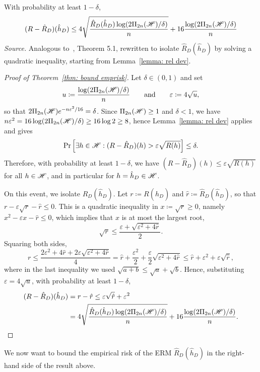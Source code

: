 \documentclass[reqno]{amsart}
\begin{document}
\begin{theorem}\label{thm: bound emprisk}
    With probability at least $1-\delta$,
    \[
    (R - \hat R_D)(\hat h_D) \le 4\sqrt{\frac{\hat R_D(\hat h_D)\log(2\Pi_{2n}(\mathscr{H})/\delta)}{n}} + 16\frac{\log(2\Pi_{2n}(\mathscr{H})/\delta)}{n}
    \]
\textnormal{\emph{Source.} Analogous to~\cite{boucheron2005theory}, Theorem 5.1, rewritten to isolate $\hat R_D(\hat h_D)$ by solving a quadratic inequality, starting from Lemma~\ref{lemma: rel dev}.}

\begin{proof}[Proof of Theorem~\ref{thm: bound emprisk}]
Let $\delta\in(0,1)$ and set
\[
u\coloneq\frac{\log(2\Pi_{2n}(\mathscr{H})/\delta)}{n} \qquad\text{and}\qquad \varepsilon\coloneq 4\sqrt{u},
\]
so that $2\Pi_{2n}(\mathscr{H})e^{-n\varepsilon^2/16} = \delta$. Since $\Pi_{2n}(\mathscr{H})\ge1$ and $\delta<1$, we have $n\varepsilon^2 = 16\log(2\Pi_{2n}(\mathscr{H})/\delta) \ge 16\log 2 \ge 8$, hence Lemma~\ref{lemma: rel dev} applies and gives
\[
\Pr\left[\exists h\in\mathscr{H} : (R-\hat R_D)(h) > \varepsilon\sqrt{R(h)}\right] \le \delta.
\]
Therefore, with probability at least $1-\delta$, we have $(R-\hat R_D)(h)\le\varepsilon\sqrt{R(h)}$ for all $h\in\mathscr{H}$, and in particular for $h=\hat h_D\in\mathscr{H}$.

On this event, we isolate $\hat R_D(\hat h_D)$. Let $r\coloneq R(\hat h_D)$ and $\hat r\coloneq\hat R_D(\hat h_D)$, so that $r-\varepsilon\sqrt r-\hat r\le0$. This is a quadratic inequality in $x\coloneq\sqrt r\ge0$, namely $x^2-\varepsilon x-\hat r\le0$, which implies that $x$ is at most the largest root,
\[
\sqrt r \le \frac{\varepsilon+\sqrt{\varepsilon^2+4\hat r}}{2}.
\]
Squaring both sides,
\[
r \le \frac{2\varepsilon^2 + 4\hat r + 2\varepsilon\sqrt{\varepsilon^2+4\hat r}}{4} = \hat r + \frac{\varepsilon^2}{2} + \frac{\varepsilon}{2}\sqrt{\varepsilon^2+4\hat r} \le \hat r + \varepsilon^2 + \varepsilon\sqrt{\hat r},
\]
where in the last inequality we used $\sqrt{a+b}\le\sqrt a+\sqrt b$. Hence, substituting $\varepsilon = 4\sqrt u$, with probability at least $1-\delta$,
\begin{align*}
(R-\hat R_D)(\hat h_D) &= r-\hat r \le \varepsilon\sqrt{\hat r} + \varepsilon^2 \\ &= 4\sqrt{\frac{\hat R_D(\hat h_D)\log(2\Pi_{2n}(\mathscr{H})/\delta)}{n}} + 16\frac{\log(2\Pi_{2n}(\mathscr{H})/\delta)}{n}.
\end{align*}
\end{proof}
\end{theorem}

We now want to bound the empirical risk of the ERM $\hat R_D(\hat h_D)$ in the right-hand side of the result above. 
\end{document}
